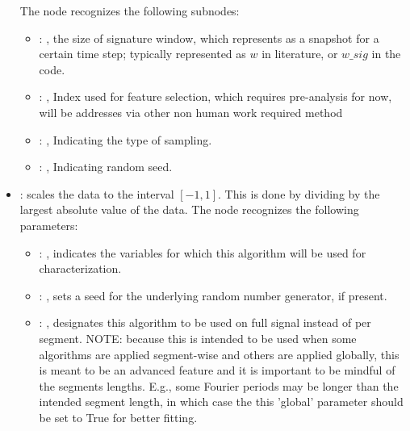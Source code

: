 \begin{itemize}
      The  node recognizes the following subnodes:
      \begin{itemize}
        \item {}: ,
          the size of signature window, which represents as a snapshot for a certain time step;
          typically represented as $w$ in literature, or $w\_sig$ in the code.

        \item {}: ,
          Index used for feature selection, which requires pre-analysis for now, will be addresses
          via other non human work required method

        \item {}: ,
          Indicating the type of sampling.

        \item {}: ,
          Indicating random seed.
      \end{itemize}

    \item {}:
      scales the data to the interval $[-1, 1]$. This is done by dividing by     the largest
      absolute value of the data.
      The  node recognizes the following parameters:
        \begin{itemize}
          \item {}: ,
            indicates the variables for which this algorithm will be used for characterization.
          \item {}: ,
            sets a seed for the underlying random number generator, if present.
          \item {}: ,
            designates this algorithm to be used on full signal instead of per
            segment. NOTE: because this is intended to be used when some algorithms are
            applied segment-wise and others are applied globally, this is meant to be an
            advanced feature and it is important to be mindful of the segments lengths.
            E.g., some Fourier periods may be longer than the intended segment length, in
            which case the this 'global' parameter should be set to True for better
            fitting. 
      \end{itemize}


\end{itemize}
